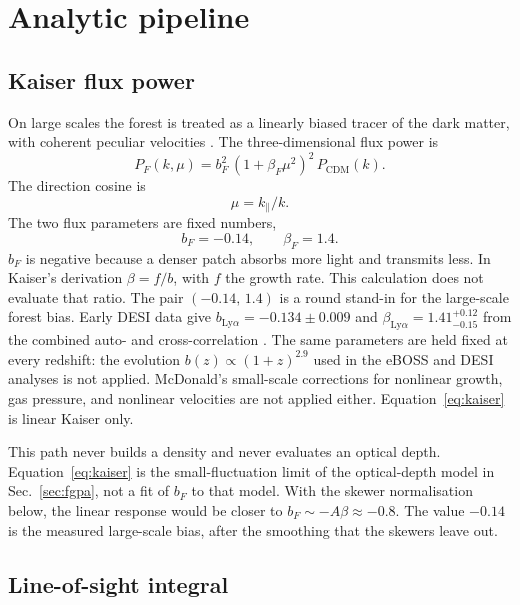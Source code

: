 \documentclass[11pt]{article}
\begin{document}
\section{Analytic pipeline}
\label{sec:kaiser}

\subsection{Kaiser flux power}

On large scales the forest is treated as a linearly biased tracer of the dark matter, with coherent peculiar velocities \cite{Kaiser:1987qv,McDonald:2001fe}. The three-dimensional flux power is
\begin{equation}
\label{eq:kaiser}
P_F(k,\mu)
=
b_F^{2}\,(1+\beta_F\mu^{2})^{2}\,P_\mathrm{CDM}(k).
\end{equation}
The direction cosine is
\begin{equation}
\mu = k_\parallel / k.
\end{equation}
The two flux parameters are fixed numbers,
\begin{equation}
b_F = -0.14, \qquad \beta_F = 1.4.
\end{equation}
$b_F$ is negative because a denser patch absorbs more light and transmits less. In Kaiser's derivation $\beta = f/b$, with $f$ the growth rate. This calculation does not evaluate that ratio. The pair $(-0.14,\,1.4)$ is a round stand-in for the large-scale forest bias. Early DESI data give $b_{\mathrm{Ly}\alpha}=-0.134\pm 0.009$ and $\beta_{\mathrm{Ly}\alpha}=1.41^{+0.12}_{-0.15}$ from the combined auto- and cross-correlation \cite{Gordon:2023dua}. The same parameters are held fixed at every redshift: the evolution $b(z)\propto (1+z)^{2.9}$ used in the eBOSS and DESI analyses \cite{eBOSS:2020tmo} is not applied. McDonald's small-scale corrections for nonlinear growth, gas pressure, and nonlinear velocities \cite{McDonald:2001fe} are not applied either. Equation~\eqref{eq:kaiser} is linear Kaiser only.

This path never builds a density and never evaluates an optical depth. Equation~\eqref{eq:kaiser} is the small-fluctuation limit of the optical-depth model in Sec.~\ref{sec:fgpa}, not a fit of $b_F$ to that model. With the skewer normalisation below, the linear response would be closer to $b_F\sim -A\beta\approx -0.8$. The value $-0.14$ is the measured large-scale bias, after the smoothing that the skewers leave out.

\subsection{Line-of-sight integral}
\end{document}
